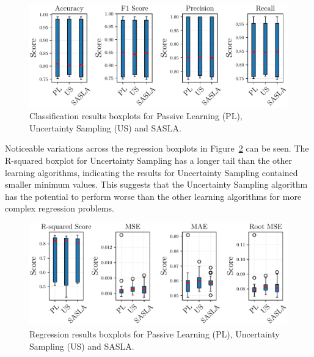 \documentclass[conference]{IEEEtran}
\begin{document}
	\begin{figure}[htbp]
		\centering
		\includegraphics[width=\linewidth]{plots/classification_boxplots.pdf}
		\caption{Classification results boxplots for Passive Learning (PL), Uncertainty Sampling (US) and SASLA.}
		\label{fig:classification_boxplots}
	\end{figure}
	
	Noticeable variations across the regression boxplots in Figure~\ref{fig:regression_boxplots} can be seen. The R-squared boxplot for Uncertainty Sampling has a longer tail than the other learning algorithms, indicating the results for Uncertainty Sampling contained smaller minimum values. This suggests that the Uncertainty Sampling algorithm has the potential to perform worse than the other learning algorithms for more complex regression problems.  
	
	\begin{figure}[htbp]
		\centering
		\includegraphics[width=\linewidth]{plots/regression_boxplots.pdf}
		\caption{Regression results boxplots for Passive Learning (PL), Uncertainty Sampling (US) and SASLA.}
		\label{fig:regression_boxplots}
	\end{figure}
	
\end{document}
